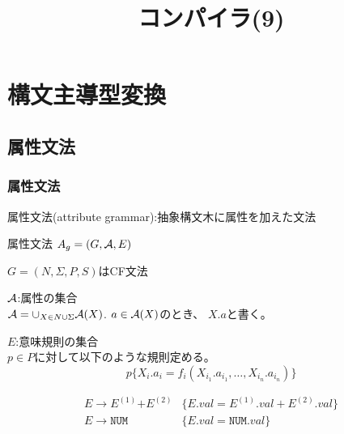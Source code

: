 \documentclass[dvipdfmx]{beamer}
\title{コンパイラ(9)}
\date{\lecturedate}
\begin{document}
\frame{\titlepage}

\section{構文主導型変換}

\subsection{属性文法}

\begin{frame}
 \frametitle{属性文法}

 属性文法(attribute grammar):抽象構文木に属性を加えた文法


 属性文法 $A_g=(G,{\cal A},E)$
 \begin{list}{}{}
  \item $G=(N,\Sigma,P,S)$はCF文法
  \item ${\cal A}$:属性の集合\\
	${\cal A}=\cup_{X\in
	N\cup\Sigma}{\cal A}(X)$.  $a\in{\cal A}(X)$のとき、
	$X.a$と書く。
  \item $E$:意味規則の集合\\
	$p\in P$に対して以下のような規則定める。
	\[
	 p\{X_i.a_i=f_i(X_{i_1}.a_{i_1},\ldots,X_{i_n}.a_{i_n})\}
	\]
 \end{list}

 \[\begin{array}{ll}
  E\rightarrow E^{(1)}\texttt{+}E^{(2)} & \{E.val=E^{(1)}.val+E^{(2)}.val\}\\
  E\rightarrow \texttt{NUM} & \{E.val=\texttt{NUM}.val\}
 \end{array}
   \]

\end{frame}
\end{document}
